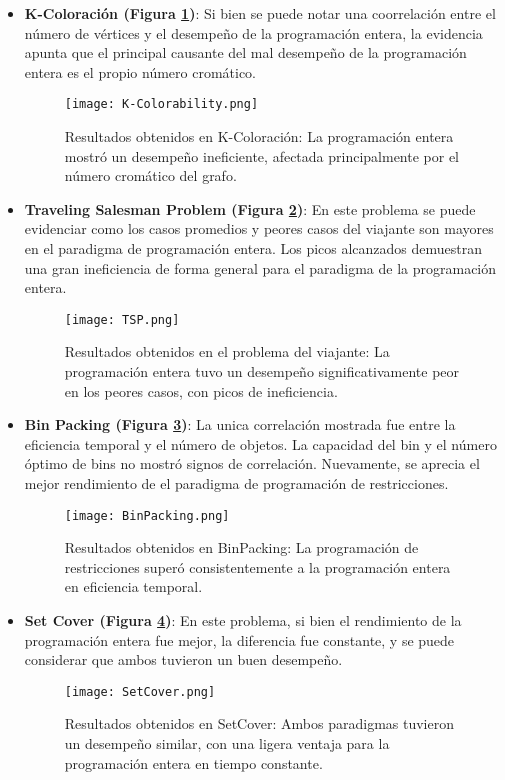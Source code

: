 \documentclass[12pt]{report}
\begin{document}
\begin{itemize}
    \item \textbf{K-Coloración (Figura \ref{fig:K-Colorability})}: Si bien se puede notar una coorrelación entre el número de vértices y el desempeño de la programación entera, la evidencia apunta que el principal causante del mal desempeño de la programación entera es el propio número cromático.
    \begin{figure}[ht]
    \centering
    \texttt{[image: K-Colorability.png]}
    \caption{Resultados obtenidos en K-Coloración: La programación entera mostró un desempeño ineficiente, afectada principalmente por el número cromático del grafo.}
    \label{fig:K-Colorability}
    \end{figure}

\newpage
    
    \item \textbf{Traveling Salesman Problem (Figura \ref{fig:TSP})}: En este problema se puede evidenciar como los casos promedios y peores casos del viajante son mayores en el paradigma de programación entera. Los picos alcanzados demuestran una gran ineficiencia de forma general para el paradigma de la programación entera.
    \begin{figure}[ht]
    \centering
    \texttt{[image: TSP.png]}
    \caption{Resultados obtenidos en el problema del viajante: La programación entera tuvo un desempeño significativamente peor en los peores casos, con picos de ineficiencia.}
    \label{fig:TSP}
    \end{figure}

\newpage

    \item \textbf{Bin Packing (Figura \ref{fig:BinPacking})}: La unica correlación mostrada fue entre la eficiencia temporal y el número de objetos. La capacidad del bin y el número óptimo de bins no mostró signos de correlación. Nuevamente, se aprecia el mejor rendimiento de el paradigma de programación de restricciones. 
    \begin{figure}[ht]
    \centering
    \texttt{[image: BinPacking.png]}
    \caption{Resultados obtenidos en BinPacking: La programación de restricciones superó consistentemente a la programación entera en eficiencia temporal.}
    \label{fig:BinPacking}
    \end{figure}

\newpage

    \item \textbf{Set Cover (Figura \ref{fig:SetCover})}: En este problema, si bien el rendimiento de la programación entera fue mejor, la diferencia fue constante, y se puede considerar que ambos tuvieron un buen desempeño.
    \begin{figure}[ht]
    \centering
    \texttt{[image: SetCover.png]}
    \caption{Resultados obtenidos en SetCover: Ambos paradigmas tuvieron un desempeño similar, con una ligera ventaja para la programación entera en tiempo constante.}
    \label{fig:SetCover}
    \end{figure}


\end{itemize}
\end{document}
